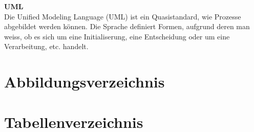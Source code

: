 \textbf{UML}\\
Die Unified Modeling Language (UML) ist ein Quasistandard, wie Prozesse abgebildet werden können. Die Sprache definiert Formen, aufgrund deren man weiss, ob es sich um eine Initialiserung, eine Entscheidung oder um eine Verarbeitung, etc. handelt.


\section{Abbildungsverzeichnis}


\section{Tabellenverzeichnis}

